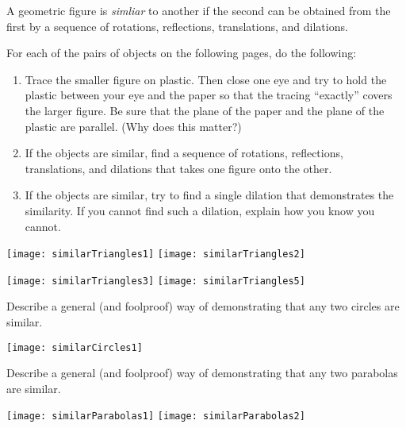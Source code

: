 \documentclass{ximera}
\begin{document}
\begin{definition}
A geometric figure is \emph{simliar} to another if the second can be obtained from the first by a sequence of rotations, reflections, translations, and dilations.  
\end{definition}

\begin{problem}
For each of the pairs of objects on the following pages, do the following:  
\begin{enumerate}
\item Trace the smaller figure on plastic.  Then close one eye and try to hold the plastic between your eye and the paper so that the tracing ``exactly'' covers the larger figure.   Be sure that the plane of the paper and the plane of the plastic are parallel.  (Why does this matter?) 
\item If the objects are similar, find a sequence of rotations, reflections, translations, and dilations that takes one figure onto the other.  
\item If the objects are similar, try to find a single dilation that demonstrates the similarity.   If you cannot find such a dilation, explain how you know you cannot.  
\end{enumerate}
\end{problem}
\vfill

\begin{image}
\texttt{[image: similarTriangles1]}
\texttt{[image: similarTriangles2]}
\end{image}

\vfill
\newpage
\vfill
\begin{image}
\texttt{[image: similarTriangles3]}
\texttt{[image: similarTriangles5]}
\end{image}
\vfill
\newpage
\begin{problem}
Describe a general (and foolproof) way of demonstrating that any two circles are 
similar.%
\end{problem}
\vfill
\begin{image}
\texttt{[image: similarCircles1]}
\end{image}
\vfill
\newpage

\begin{problem}
Describe a general (and foolproof) way of demonstrating that any two parabolas are similar. 
\end{problem}
\vfill
\begin{image}
\texttt{[image: similarParabolas1]}
\texttt{[image: similarParabolas2]}
\end{image}
\vfill
\end{document}

